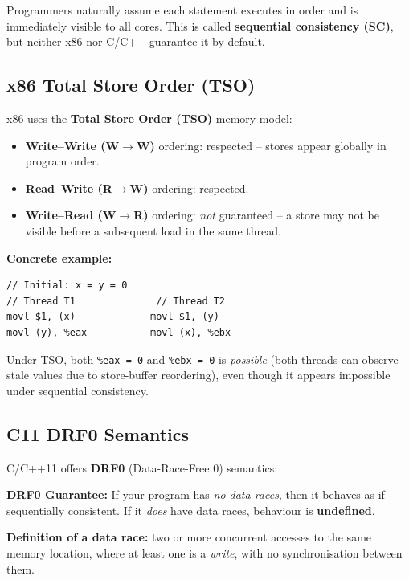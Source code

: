 \documentclass[11pt,a4paper]{article}
\newcommand{\term}[1]{\textbf{#1}}
\newcommand{\code}[1]{\texttt{#1}}
\begin{document}
Programmers naturally assume each statement executes in order and is
immediately visible to all cores.  This is called \term{sequential
consistency (SC)}, but neither x86 nor C/C++ guarantee it by default.

\subsection{x86 Total Store Order (TSO)}

x86 uses the \term{Total Store Order (TSO)} memory model:

\begin{itemize}
  \item \textbf{Write--Write (W$\to$W)} ordering: respected -- stores appear
    globally in program order.
  \item \textbf{Read--Write (R$\to$W)} ordering: respected.
  \item \textbf{Write--Read (W$\to$R)} ordering: \emph{not} guaranteed --
    a store may not be visible before a subsequent load in the same thread.
\end{itemize}

\textbf{Concrete example:}

\begin{lstlisting}
// Initial: x = y = 0
// Thread T1              // Thread T2
movl $1, (x)             movl $1, (y)
movl (y), %eax           movl (x), %ebx
\end{lstlisting}

Under TSO, both \code{\%eax = 0} and \code{\%ebx = 0} is \emph{possible}
(both threads can observe stale values due to store-buffer reordering), even
though it appears impossible under sequential consistency.

\subsection{C11 DRF0 Semantics}

C/C++11 offers \term{DRF0} (Data-Race-Free 0) semantics:

\begin{keybox}
\textbf{DRF0 Guarantee:} If your program has \emph{no data races}, then it
behaves as if sequentially consistent.  If it \emph{does} have data races,
behaviour is \textbf{undefined}.
\end{keybox}

\textbf{Definition of a data race:} two or more concurrent accesses to the
same memory location, where at least one is a \emph{write}, with no
synchronisation between them.
\end{document}
